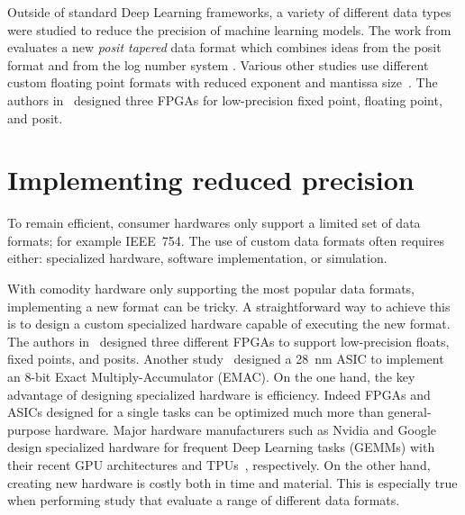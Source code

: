 Outside of standard Deep Learning frameworks, a variety of different data types were
studied to reduce the precision of machine learning models.
The work from~\cite{Johnson2018-up} evaluates a new \textit{posit tapered} data 
format which combines ideas from the posit~\cite{Gustafson2017-wo} format and from the log number system .
Various other studies use different custom floating point formats with reduced 
exponent and mantissa size~\cite{Lesser2011-mn, Chen2018-an, Vicuna2021-mw, Wang2018-oo}.
The authors in~\cite{Carmichael2019-nu} designed three FPGAs for low-precision fixed
point, floating point, and posit.

\section{Implementing reduced precision}
To remain efficient, consumer hardwares only support a limited set of data formats; for example IEEE~754.
The use of custom data formats often requires either: specialized hardware, software implementation, or simulation.

With comodity hardware only supporting the most popular data formats, implementing a new format can be tricky.
A straightforward way to achieve this is to design a custom specialized hardware capable of executing the new format.
The authors in~\cite{Carmichael2019-nu} designed three different FPGAs to support low-precision floats, fixed points, and posits.
Another study~\cite{Johnson2018-up} designed a \SI{28}{\nano\meter} ASIC to implement an 8-bit Exact Multiply-Accumulator (EMAC).
On the one hand, the key advantage of designing specialized hardware is efficiency.
Indeed FPGAs and ASICs designed for a single tasks can be optimized much more than general-purpose hardware.
Major hardware manufacturers such as Nvidia and Google design specialized hardware
for frequent Deep Learning tasks (GEMMs) with their recent GPU architectures and TPUs~\cite{tpu}, respectively.
On the other hand, creating new hardware is costly both in time and material.
This is especially true when performing study that evaluate a range of different data formats.

